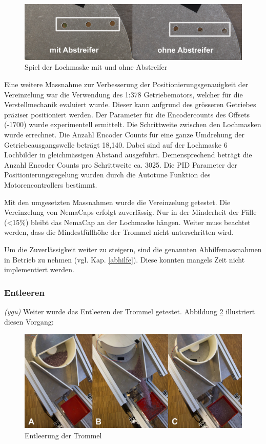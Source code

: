 \begin{figure}[H]
	\includegraphics[draft=false,width=1\textwidth]{Illustrationen/7-Inbetriebnahme_und_Kalibration/spiel_lochmaske_1.jpg}
	\caption{Spiel der Lochmaske mit und ohne Abstreifer}
	\label{fig:spiel_lochmaske}
\end{figure}

Eine weitere Massnahme zur Verbesserung der Positionierungsgenauigkeit der Vereinzelung war die Verwendung des 1:378 Getriebemotors, welcher für die Verstellmechanik evaluiert wurde. Dieser kann aufgrund des grösseren Getriebes präziser positioniert werden. Der Parameter für die Encodercounts des Offsets (-1700) wurde experimentell ermittelt. Die Schrittweite zwischen den Lochmasken wurde errechnet. Die Anzahl Encoder Counts für eine ganze Umdrehung der Getriebeausgangswelle beträgt 18,140. Dabei sind auf der Lochmaske 6 Lochbilder in gleichmässigen Abstand ausgeführt. Demensprechend beträgt die Anzahl Encoder Counts pro Schrittweite ca. 3025. Die PID Parameter der Positionierungsregelung wurden durch die Autotune Funktion des Motorencontrollers bestimmt.
\newline

Mit den umgesetzten Massnahmen wurde die Vereinzelung getestet. Die Vereinzelung von NemaCaps erfolgt zuverlässig. Nur in der Minderheit der Fälle (<15\%) bleibt das NemaCap an der Lochmaske hängen. Weiter muss beachtet werden, dass die Mindestfüllhöhe der Trommel nicht unterschritten wird.
\newline

Um die Zuverlässigkeit weiter zu steigern, sind die genannten Abhilfemassnahmen in Betrieb zu nehmen (vgl. Kap. \ref{abhilfe}). Diese konnten mangels Zeit nicht implementiert werden.
\subsubsection{Entleeren}
\textit{(ygu)} Weiter wurde das Entleeren der Trommel getestet. Abbildung \ref{fig:entleeren} illustriert diesen Vorgang:

\begin{figure}[H]
	\includegraphics[draft=false,width=1\textwidth]{Illustrationen/7-Inbetriebnahme_und_Kalibration/entleeren.jpg}
	\caption{Entleerung der Trommel}
	\label{fig:entleeren}
\end{figure}

